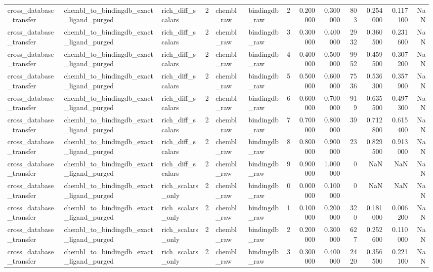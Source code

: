 \begin{longtable}{lllrllrrrrrrr}
cross\_database\_transfer & chembl\_to\_bindingdb\_exact\_ligand\_purged & rich\_diff\_scalars & 2 & chembl\_raw & bindingdb\_raw & 2 & 0.200000 & 0.300000 & 803 & 0.254000 & 0.117100 & NaN \\
cross\_database\_transfer & chembl\_to\_bindingdb\_exact\_ligand\_purged & rich\_diff\_scalars & 2 & chembl\_raw & bindingdb\_raw & 3 & 0.300000 & 0.400000 & 2932 & 0.360500 & 0.231600 & NaN \\
cross\_database\_transfer & chembl\_to\_bindingdb\_exact\_ligand\_purged & rich\_diff\_scalars & 2 & chembl\_raw & bindingdb\_raw & 4 & 0.400000 & 0.500000 & 9952 & 0.459500 & 0.307200 & NaN \\
cross\_database\_transfer & chembl\_to\_bindingdb\_exact\_ligand\_purged & rich\_diff\_scalars & 2 & chembl\_raw & bindingdb\_raw & 5 & 0.500000 & 0.600000 & 7536 & 0.536300 & 0.357900 & NaN \\
cross\_database\_transfer & chembl\_to\_bindingdb\_exact\_ligand\_purged & rich\_diff\_scalars & 2 & chembl\_raw & bindingdb\_raw & 6 & 0.600000 & 0.700000 & 919 & 0.635500 & 0.497300 & NaN \\
cross\_database\_transfer & chembl\_to\_bindingdb\_exact\_ligand\_purged & rich\_diff\_scalars & 2 & chembl\_raw & bindingdb\_raw & 7 & 0.700000 & 0.800000 & 39 & 0.712800 & 0.615400 & NaN \\
cross\_database\_transfer & chembl\_to\_bindingdb\_exact\_ligand\_purged & rich\_diff\_scalars & 2 & chembl\_raw & bindingdb\_raw & 8 & 0.800000 & 0.900000 & 23 & 0.829500 & 0.913000 & NaN \\
cross\_database\_transfer & chembl\_to\_bindingdb\_exact\_ligand\_purged & rich\_diff\_scalars & 2 & chembl\_raw & bindingdb\_raw & 9 & 0.900000 & 1.000000 & 0 & NaN & NaN & NaN \\
cross\_database\_transfer & chembl\_to\_bindingdb\_exact\_ligand\_purged & rich\_scalars\_only & 2 & chembl\_raw & bindingdb\_raw & 0 & 0.000000 & 0.100000 & 0 & NaN & NaN & NaN \\
cross\_database\_transfer & chembl\_to\_bindingdb\_exact\_ligand\_purged & rich\_scalars\_only & 2 & chembl\_raw & bindingdb\_raw & 1 & 0.100000 & 0.200000 & 320 & 0.181000 & 0.006200 & NaN \\
cross\_database\_transfer & chembl\_to\_bindingdb\_exact\_ligand\_purged & rich\_scalars\_only & 2 & chembl\_raw & bindingdb\_raw & 2 & 0.200000 & 0.300000 & 627 & 0.252600 & 0.110000 & NaN \\
cross\_database\_transfer & chembl\_to\_bindingdb\_exact\_ligand\_purged & rich\_scalars\_only & 2 & chembl\_raw & bindingdb\_raw & 3 & 0.300000 & 0.400000 & 2420 & 0.356500 & 0.221100 & NaN \\

\end{longtable}
